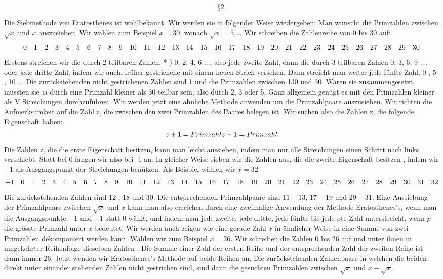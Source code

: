 \documentclass{article}
\begin{document}
$$§2.$$

Die Siebmethode von Eratosthenes ist wohlbekannt. Wir werden sie in folgender Weise wiedergeben: Man wünscht die Primzahlen zwischen $\sqrt{x}$ und $x$ auszusieben. Wir wählen zum Beispiel $x=30$, wonach $\sqrt{x}=5$,... Wir schreiben die Zahlenreihe von $0$ bis $30$ auf:
$$0\quad1\quad2\quad3\quad4\quad5\quad6\quad7\quad8\quad9\quad10\quad11\quad12\quad13\quad14\quad15\quad16\quad17\quad18\\\quad19\quad20\quad21\quad22\quad23\quad24\quad25\quad26\quad27\quad28\quad29\quad30$$
Erstens streichen wir die durch 2 teilbaren Zahlen, * ) 0, 2, 4, 6 ..., also jede zweite Zahl, dann die durch 3 teilbaren Zahlen 0, 3, 6, 9 ..., oder jede dritte Zahl, indem wir auch. früher gestrichene mit einem neuen Strich versehen. Dann streicht man weiter jede fünfte Zahl, 0 , 5 , 10 ... Die zurückstehenden nicht gestrichenen Zahlen sind 1 und die Primzahlen zwischen 130 und 30. Wären sie zusammengesetzt, müssten sie ja durch eine Primzahl kleiner als 30 teilbar sein, also durch 2, 3 oder 5. Ganz allgemein genügt es mit den Primzahlen kleiner als V Streichungen durchzuführen. Wir werden jetzt eine ähnliche Methode anwenden um die Primzahlpaare auszusieben. Wir richten die Aufmerksamkeit auf die Zahl z, die zwischen den zwei Primzahlen des Paares belegen ist. Wir suchen also die Zahlen z, die folgende Eigenschaft haben:
$$
z+1=Primzahl\\
z-1=Primzahl
$$
Die Zahlen z, die die erste Eigenschaft besitzen, kann man leicht aussieben, indem man nur alle Streichungen einen Schritt nach links verschiebt. Statt bei 0 fangen wir also bei -1 an. In gleicher Weise sieben wir die Zahlen aus, die die zweite Eigenschaft besitzen , indem wir +1 als Ausgangspunkt der Streichungen benützen. Als Beispiel wählen wir $x=32$
$$-1\quad0\quad1\quad2\quad3\quad4\quad5\quad6\quad7\quad8\quad9\quad10\quad11\quad12\quad13\quad14\quad15\quad16\quad17\quad18\\\quad19\quad20\quad21\quad22\quad23\quad24\quad25\quad26\quad27\quad28\quad29\quad30\quad31\quad32$$
Die zurückstehenden Zahlen sind 12 , 18 und 30. Die entsprechenden Primzahlpaare sind $11-13$, $17-19$ und $29-31$.
Eine Aussiebung der Primzahlpaare zwischen $\sqrt{x}$ und $x$ kann man also erreichen durch eine zweimalige Anwendung der Methode Eratosthenes's, wenn man die Ausgangspunkte $-1$ und $+1$ statt $0$ wählt, und indem man jede zweite, jede dritte, jede fünfte bis jede pte Zahl unterstreicht, wenn $p$ die grösste Primzahl unter $x$ bedeutet.
Wir werden auch zeigen wie eine gerade Zahl $x$ in ähnlicher Weise in eine Summe von zwei Primzahlen dekomponiert werden kann. Wählen wir zum Beispiel $x=26$. Wir schreiben die Zahlen 0 bis 26 auf und unter ihnen in umgekehrter Reihenfolge dieselben Zahlen . Die Summe einer Zahl der ersten Reihe und der entsprechenden Zahl der zweiten Reihe ist dann immer $26$. Jetzt wenden wir Eratosthenes's Methode auf beide Reihen an. Die zurückstehenden Zahlenpaare in welchen die beiden direkt unter einander stehenden Zahlen nicht gestrichen sind, sind dann die gesuchten Primzahlen zwischen $\sqrt{x}$ und $x-\sqrt{x}$.
\end{document}
